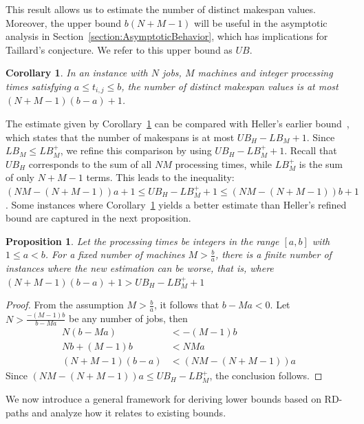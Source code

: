 \documentclass{article}
\theoremstyle{thmstyleone}%
\newtheorem{proposition}[theorem]{Proposition}%
\newtheorem{corollary}[theorem]{Corollary}%
\theoremstyle{thmstyletwo}%
\theoremstyle{thmstylethree}%
\begin{document}
This result allows us to estimate the number of distinct makespan values. 
Moreover, the upper bound $b(N + M - 1)$ will be useful in the asymptotic analysis in Section~\ref{section:AsymptoticBehavior}, which has implications for Taillard's conjecture. 
We refer to this upper bound as $UB$.

\begin{corollary}
\label{Coro:NumberMakespans}
In an instance with $N$ jobs, $M$ machines and integer processing times satisfying $a \leq t_{i,j} \leq b$, the number of distinct makespan values is at most $(N + M - 1)(b - a) + 1$. 
\end{corollary}

The estimate given by Corollary~\ref{Coro:NumberMakespans} can be compared with Heller's earlier bound~\cite{Heller}, which states that the number of makespans is at most $UB_H - LB_M + 1$. Since $LB_M \leq LB_M^+$, we refine this comparison by using $UB_H - LB_M^+ + 1$. 
Recall that $UB_H$ corresponds to the sum of all $NM$ processing times, while $LB_M^+$ is the sum of only $N + M - 1$ terms. This leads to the inequality: $(NM - (N +  M  - 1))a + 1 \leq UB_H - LB_M^+ + 1 \leq (NM - (N +  M  - 1))b + 1$. 
Some instances where Corollary~\ref{Coro:NumberMakespans} yields a better estimate than Heller's refined bound are captured in the next proposition. 

\begin{proposition}
Let the processing times be integers in the range $[a, b]$ with $1 \leq a < b$. For a fixed number of machines $M > \frac{b}{a}$, there is a finite number of instances where the new estimation can be worse, that is, where $(N + M - 1)(b - a) + 1 > UB_H - LB_M^+ + 1$
\end{proposition}
\begin{proof}
From the assumption $M > \frac{b}{a}$, it follows that $b - Ma < 0$. Let $N > \frac{-(M - 1)b}{b - Ma}$ be any number of jobs, then
\begin{align*}
N(b - Ma) &< -(M - 1)b\\
Nb + (M - 1)b &< NMa\\
(N + M  - 1)(b - a) &< (NM - (N + M - 1))a
\end{align*}
Since $(NM - (N + M - 1))a \leq UB_H - LB_M^+ $, the conclusion follows.  
\end{proof}

We now introduce a general framework for deriving lower bounds based on RD-paths and analyze how it relates to existing bounds. 
\end{document}
